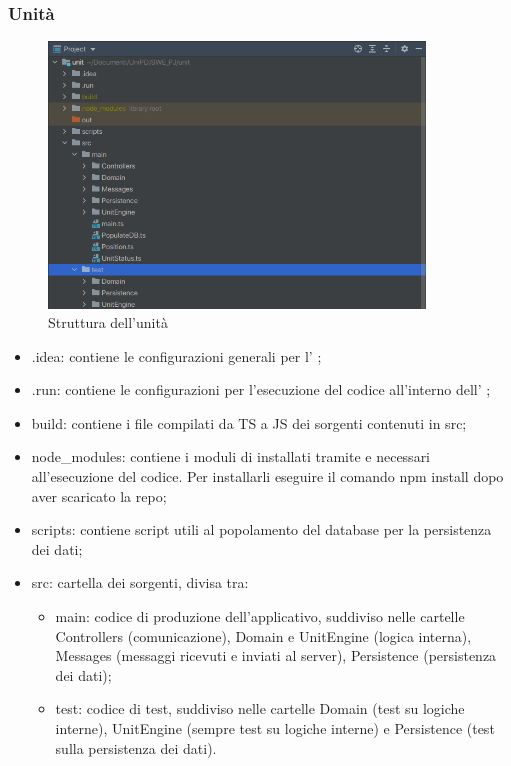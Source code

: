 \newpage

	\subsubsection{Unità}

	\begin{figure}[H]
		\centering
		\includegraphics[width=10cm]{img/struttura_unita.png}
		\caption{Struttura dell'unità}
	\end{figure}

	\begin{itemize}
		\item{.idea}: contiene le configurazioni generali per l' ;
		\item{.run}: contiene le configurazioni per l'esecuzione del codice all'interno dell' ;
		\item{build}: contiene i file compilati da TS a JS dei sorgenti contenuti in src;
		\item{node\_modules}: contiene i moduli di  installati tramite  e necessari all'esecuzione del codice. Per installarli eseguire il comando npm install dopo aver scaricato la repo;
		\item{scripts}: contiene script utili al popolamento del database per la persistenza dei dati;
		\item{src}: cartella dei sorgenti, divisa tra:
		\begin{itemize}
			\item{main}: codice di produzione dell'applicativo, suddiviso nelle cartelle Controllers (comunicazione), Domain e UnitEngine (logica interna), Messages (messaggi ricevuti e inviati al server), Persistence (persistenza dei dati);
			\item{test}: codice di test, suddiviso nelle cartelle Domain (test su logiche interne),	UnitEngine (sempre test su logiche interne) e Persistence (test sulla persistenza dei dati).
		\end{itemize}
	\end{itemize}

